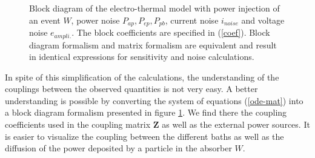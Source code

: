 \begin{figure}[!ht]
\begin{center}
\resizebox{\textwidth}{!}{%
\begin{tikzpicture}
	
\end{tikzpicture}
}%
\end{center}
\caption{Block diagram of the electro-thermal model with power injection of an event $W$, power noise $P_{ap}, P_{ep}, P_{pb}$, current noise $i_{noise}$ and voltage noise $e_{ampli.}$. The block coefficients are specified in (\ref{coef}). Block diagram formalism and matrix formalism are equivalent and result in identical expressions for sensitivity and noise calculations.
}
\label{block-diagram}
\end{figure}

In spite of this simplification of the calculations, the understanding of the couplings between the observed quantities is not very easy. A better understanding is possible by converting the system of equations (\ref{ode-mat}) into a block diagram formalism presented in figure \ref{block-diagram}. We find there the coupling coefficients used in the coupling matrix $\bm{Z}$ as well as the external power sources. It is easier to visualize the coupling between the different baths as well as the diffusion of the power deposited by a particle in the absorber $W$.

